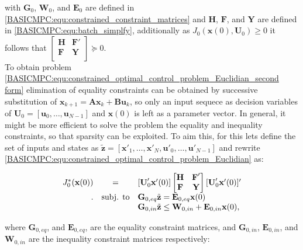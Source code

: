     with $\textbf{G}_0$, $\textbf{W}_0$, and $\textbf{E}_0$ are defined in \ref{BASICMPC:equ:constrained_constraint_matrices} and $\textbf{H}$, $\textbf{F}$, and $\textbf{Y}$ are defined in \ref{BASICMPC:equ:batch_simplfy}, additionally as $J_0(\textbf{x}(0),\textbf{U}_0)\geq 0$ it follows that $\begin{bmatrix}
            \textbf{H}&\textbf{F}'\\
            \textbf{F}&\textbf{Y}\\
            \end{bmatrix}\succeq 0$.\\
    To obtain problem \ref{BASICMPC:equ:constrained_optimal_control_problem_Euclidian_second form} elimination of equality constraints can be obtained by successive substitution of $\textbf{x}_{k+1}=\textbf{Ax}_{k}+\textbf{Bu}_{k}$, so only an input sequece as decision variables of $\textbf{U}_0=[\textbf{u}_0,\dots,\textbf{u}_{N-1}]$ and $\textbf{x}(0)$ is left as a parameter vector. In general, it might be more efficient to solve the problem the equality and inequality constraints, so that sparsity can be exploited. To aim this, for this lets define the set of inputs and states as $\tilde{\textbf{z}}=[\textbf{x}'_1,\dots,\textbf{x}'_N,\textbf{u}'_0,\dots,\textbf{u}'_{N-1}]$ and rewrite \ref{BASICMPC:equ:constrained_optimal_control_problem_Euclidian} as:

    \begin{equation}
    \begin{array}{rcl}
            J^*_0(\textbf{x}(0))
            &=&[\textbf{U}'_0\textbf{x}'(0)]
            \begin{bmatrix}
            \textbf{H}&\textbf{F}'\\
            \textbf{F}&\textbf{Y}\\
            \end{bmatrix}
            [\textbf{U}'_0\textbf{x}'(0)]'\\.
            &\textnormal{subj. to}&\textbf{G}_{0,eq}\tilde{\textbf{z}}=\textbf{E}_{0,eq}\textbf{x}(0)\\
            &&\textbf{G}_{0,in}\tilde{\textbf{z}}\leq\textbf{W}_{0,in}+\textbf{E}_{0,in}\textbf{x}(0),
        \end{array}
        \label{BASICMPC:equ:constrained_Euclidian_mergedconstraint}
    \end{equation}

    where $\textbf{G}_{0,eq}$, and $\textbf{E}_{0,eq}$, are the equality constraint matrices, and  $\textbf{G}_{0,in}$, $\textbf{E}_{0,in}$, and $\textbf{W}_{0,in}$ are the inequality constraint matrices respectively:

